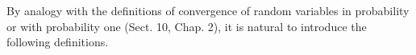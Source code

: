 By analogy with the definitions of convergence of random variables in probability or with probability one (Sect. 10, Chap. 2), it is natural to introduce the following definitions.
